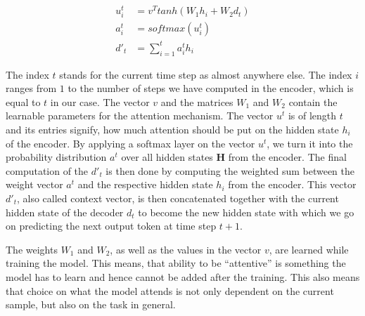 \begin{equation}
\label{fundamentals:attention:equations}
\begin{split}
	u^t_i & = v^T tanh(W_1 h_i + W_2 d_t) \\
	a^t_i & = softmax(u^t_i) \\
	d'_t & = \sum_{i=1}^{t} a^t_i h_i
\end{split}
\end{equation}

The index $t$ stands for the current time step as almost anywhere else. The index $i$ ranges from $1$ to the number of steps we have computed in the encoder, which is equal to $t$ in our case. The vector $v$ and the matrices $W_1$ and $W_2$ contain the learnable parameters for the attention mechanism. The vector $u^t$ is of length $t$ and its entries signify, how much attention should be put on the hidden state $h_i$ of the encoder. By applying a softmax layer on the vector $u^t$, we turn it into the probability distribution $a^t$ over all hidden states $\mathbf{H}$ from the encoder. The final computation of the $d'_t$ is then done by computing the weighted sum between the weight vector $a^t$ and the respective hidden state $h_i$ from the encoder. This vector $d'_t$, also called context vector, is then concatenated together with the current hidden state of the decoder $d_t$ to become the new hidden state with which we go on predicting the next output token at time step $t+1$.

The weights $W_1$ and $W_2$, as well as the values in the vector $v$, are learned while training the model. This means, that ability to be ``attentive'' is something the model has to learn and hence cannot be added after the training. This also means that choice on what the model attends is not only dependent on the current sample, but also on the task in general.

